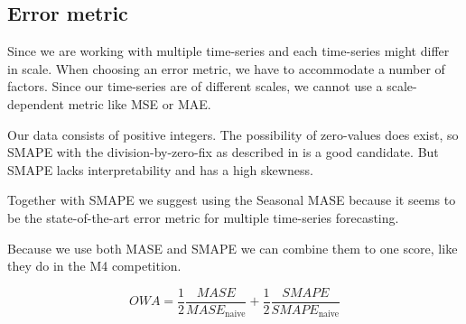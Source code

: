 \subsection{Error metric}


Since we are working with multiple time-series and each time-series might differ in scale.
When choosing an error metric, we have to accommodate a number of factors.
Since our time-series are of different scales, we cannot use a scale-dependent metric
like MSE or MAE.

Our data consists of positive integers. The possibility of zero-values does exist,
so SMAPE with the division-by-zero-fix as described in  is a good candidate.
But SMAPE lacks interpretability and has a high skewness.

Together with SMAPE we suggest using the Seasonal MASE because it seems to be the
state-of-the-art error metric for multiple time-series forecasting.

Because we use both MASE and SMAPE we can combine them to one score, like
they do in the M4 competition.

\begin{equation}
  \label{eq:OWA}
  OWA = \frac{1}{2} \frac{MASE}{MASE_{\text{naive}}} + \frac{1}{2} \frac{SMAPE}{SMAPE_{\text{naive}}}
\end{equation}
